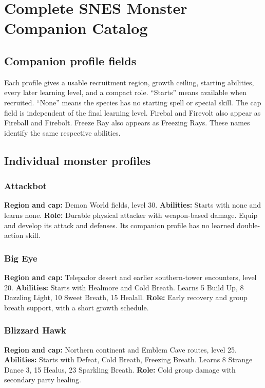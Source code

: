 \chapter{Complete SNES Monster Companion Catalog}
\label{written-companions}

\section{Companion profile fields}
Each profile gives a usable recruitment region, growth ceiling, starting
abilities, every later learning level, and a compact role. ``Starts'' means
available when recruited. ``None'' means the species has no starting spell
or special skill. The cap field is independent of the final learning level.
Firebal and Firevolt also appear as Fireball and Firebolt. Freeze Ray also
appears as Freezing Rays. These names identify the same respective abilities.

\section{Individual monster profiles}

\subsection{Attackbot}
\textbf{Region and cap:} Demon World fields, level 30.
\textbf{Abilities:} Starts with none and learns none.
\textbf{Role:} Durable physical attacker with weapon-based damage. Equip and
develop its attack and defenses. Its companion profile has no learned double-action skill.

\subsection{Big Eye}
\textbf{Region and cap:} Telepador desert and earlier southern-tower encounters, level 20.
\textbf{Abilities:} Starts with Healmore and Cold Breath. Learns 5 Build Up,
8 Dazzling Light, 10 Sweet Breath, 15 Healall.
\textbf{Role:} Early recovery and group breath support, with a short growth schedule.

\subsection{Blizzard Hawk}
\textbf{Region and cap:} Northern continent and Emblem Cave routes, level 25.
\textbf{Abilities:} Starts with Defeat, Cold Breath, Freezing Breath.
Learns 8 Strange Dance 3, 15 Healus, 23 Sparkling Breath.
\textbf{Role:} Cold group damage with secondary party healing.

